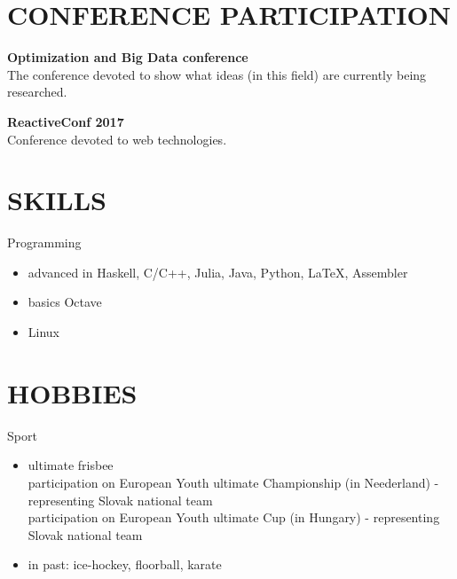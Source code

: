 \documentclass[margin, 10pt]{res} %
\begin{document}
\begin{resume}
		
		\section{CONFERENCE PARTICIPATION}
		\textbf{Optimization and Big Data conference}\\
		The conference devoted to show what ideas (in this field) are currently being researched.
		
		\textbf{ReactiveConf 2017}\\
		Conference devoted to web technologies.
		
		
		\section{SKILLS}
		
		Programming
		\begin{itemize} \itemsep -2pt
			\item advanced in Haskell, C/C++, Julia, Java, Python, \LaTeX, Assembler
			\item basics Octave
			\item Linux
		\end{itemize}
		
		\section{HOBBIES} 
		Sport
		\begin{itemize} \itemsep -2pt
			\item ultimate frisbee \\
			participation on European Youth ultimate Championship (in Neederland) - representing Slovak national team\\
			participation on European Youth ultimate Cup (in Hungary) - representing Slovak national team
			\item in past: ice-hockey, floorball, karate
		\end{itemize}
		
		
	\end{resume}
\end{document}
